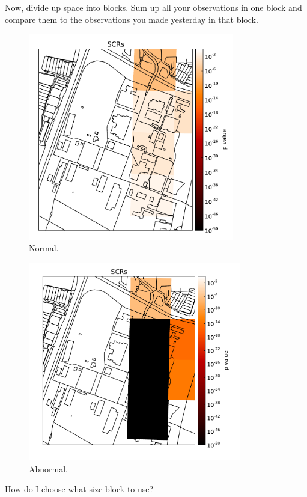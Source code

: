 \documentclass[ignorenonframetext]{beamer}
\begin{document}
Now, divide up space into blocks. Sum up all your observations in one block and
compare them to the observations you made yesterday in that block. 

\begin{frame}
  \begin{figure}
    \includegraphics[width=90mm]{figures/talk-prc-preradiography-scr.pdf}
    \caption{Normal.}
  \end{figure}
\end{frame}

\begin{frame}
  \begin{figure}
    \includegraphics[width=93mm]{figures/talk-prc-radiography-scr.pdf}
    \caption{Abnormal.}
  \end{figure}
\end{frame}

How do I choose what size block to use?
\end{document}
